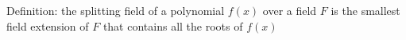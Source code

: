 \documentclass[preview]{standalone}
\begin{document}
\begin{center}
Definition: the splitting field of a polynomial $f(x)$ over a field $F$ is the smallest field extension of $F$ that contains all the roots of $f(x)$
\end{center}
\end{document}
